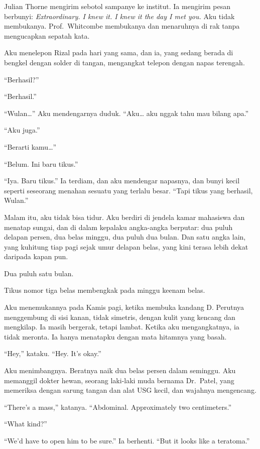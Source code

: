 \documentclass[11pt,twoside,openany]{book}
\makeatletter
\newcommand{\scenebreak}{\par\vspace{0.9em}{\centering\textsc{*\hspace{0.7em}*\hspace{0.7em}*}\par}\vspace{0.9em}\@afterindentfalse\@afterheading}
\makeatother
\begin{document}
Julian Thorne mengirim sebotol sampanye ke institut. Ia mengirim pesan berbunyi: \emph{Extraordinary. I knew it. I knew it the day I met you.} Aku tidak membukanya. Prof.~Whitcombe membukanya dan menaruhnya di rak tanpa mengucapkan sepatah kata.

Aku menelepon Rizal pada hari yang sama, dan ia, yang sedang berada di bengkel dengan solder di tangan, mengangkat telepon dengan napas terengah.

``Berhasil?''

``Berhasil.''

``Wulan\ldots{}'' Aku mendengarnya duduk. ``Aku\ldots{} aku nggak tahu mau bilang apa.''

``Aku juga.''

``Berarti kamu\ldots{}''

``Belum. Ini baru tikus.''

``Iya. Baru tikus.'' Ia terdiam, dan aku mendengar napasnya, dan bunyi kecil seperti seseorang menahan sesuatu yang terlalu besar. ``Tapi tikus yang berhasil, Wulan.''

Malam itu, aku tidak bisa tidur. Aku berdiri di jendela kamar mahasiswa dan menatap sungai, dan di dalam kepalaku angka-angka berputar: dua puluh delapan persen, dua belas minggu, dua puluh dua bulan. Dan satu angka lain, yang kuhitung tiap pagi sejak umur delapan belas, yang kini terasa lebih dekat daripada kapan pun.

Dua puluh satu bulan.

\scenebreak
Tikus nomor tiga belas membengkak pada minggu keenam belas.

Aku menemukannya pada Kamis pagi, ketika membuka kandang D. Perutnya menggembung di sisi kanan, tidak simetris, dengan kulit yang kencang dan mengkilap. Ia masih bergerak, tetapi lambat. Ketika aku mengangkatnya, ia tidak meronta. Ia hanya menatapku dengan mata hitamnya yang basah.

``Hey,'' kataku. ``Hey. It's okay.''

Aku menimbangnya. Beratnya naik dua belas persen dalam seminggu. Aku memanggil dokter hewan, seorang laki-laki muda bernama Dr.~Patel, yang memeriksa dengan sarung tangan dan alat USG kecil, dan wajahnya mengencang.

``There's a mass,'' katanya. ``Abdominal. Approximately two centimeters.''

``What kind?''

``We'd have to open him to be sure.'' Ia berhenti. ``But it looks like a teratoma.''
\end{document}

